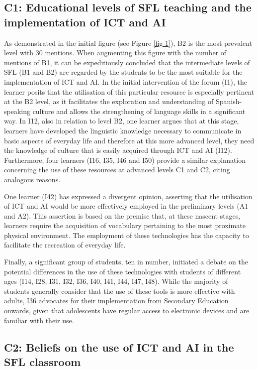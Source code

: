 \documentclass[english]{textolivre}
\begin{document}
\subsection{C1: Educational levels of SFL teaching and the implementation of ICT and AI}
As demonstrated in the initial figure (see Figure \ref{fig-1}), B2 is the most prevalent level with 30 mentions. When augmenting this figure with the number of mentions of B1, it can be expeditiously concluded that the intermediate levels of SFL (B1 and B2) are regarded by the students to be the most suitable for the implementation of ICT and AI. In the initial intervention of the forum (I1), the learner posits that the utilisation of this particular resource is especially pertinent at the B2 level, as it facilitates the exploration and understanding of Spanish-speaking culture and allows the strengthening of language skills in a significant way. In I12, also in relation to level B2, one learner argues that at this stage, learners have developed the linguistic knowledge necessary to communicate in basic aspects of everyday life and therefore at this more advanced level, they need the knowledge of culture that is easily acquired through ICT and AI (I12). Furthermore, four learners (I16, I35, I46 and I50) provide a similar explanation concerning the use of these resources at advanced levels C1 and C2, citing analogous reasons.

One learner (I42) has expressed a divergent opinion, asserting that the utilisation of ICT and AI would be more effectively employed in the preliminary levels (A1 and A2). This assertion is based on the premise that, at these nascent stages, learners require the acquisition of vocabulary pertaining to the most proximate physical environment. The employment of these technologies has the capacity to facilitate the recreation of everyday life.

Finally, a significant group of students, ten in number, initiated a debate on the potential differences in the use of these technologies with students of different ages (I14, I28, I31, I32, I36, I40, I41, I44, I47, I48). While the majority of students generally consider that the use of these tools is more effective with adults, I36 advocates for their implementation from Secondary Education onwards, given that adolescents have regular access to electronic devices and are familiar with their use.

\subsection{C2: Beliefs on the use of ICT and AI in the SFL classroom}
\end{document}
